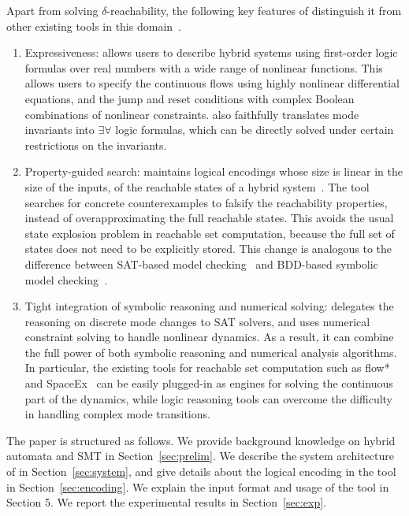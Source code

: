 Apart from solving $\delta$-reachability, the following key features
of \dReach{} distinguish it from other existing tools in this
domain~\cite{DBLP:journals/jlp/FranzleTE10,DBLP:conf/cav/FrehseGDCRLRGDM11,DBLP:journals/tac/AlthoffK14,DBLP:conf/hybrid/Frehse05,DBLP:conf/icons/HerdeEFT08,DBLP:conf/rtss/ChenAS12,DBLP:conf/aaai/CimattiMT12}.
\begin{enumerate}
\item Expressiveness: \dReach{} allows users to describe hybrid
  systems using first-order logic formulas over real numbers with a
  wide range of nonlinear functions. This allows users to specify the
  continuous flows using highly nonlinear differential equations, and
  the jump and reset conditions with complex Boolean combinations of
  nonlinear constraints. \dReach{} also faithfully translates mode
  invariants into $\exists\forall$ logic formulas, which can be
  directly solved under certain restrictions on the invariants.
\item Property-guided search: \dReach{} maintains logical encodings
  whose size is linear in the size of the inputs, of the reachable
  states of a hybrid system~\cite{DBLP:journals/corr/GaoKCC14}. The
  tool searches for concrete counterexamples to falsify the
  reachability properties, instead of overapproximating the full
  reachable states. This avoids the usual state explosion problem in
  reachable set computation, because the full set of states does not
  need to be explicitly stored. This change is analogous to the
  difference between SAT-based model
  checking~\cite{Biere:1999:SMC:646483.691738} and BDD-based symbolic
  model checking~\cite{McMillan:1993:SMC:530225}.
\item Tight integration of symbolic reasoning and numerical solving:
  \dReach{} delegates the reasoning on discrete mode changes to SAT
  solvers, and uses numerical constraint solving to handle nonlinear
  dynamics. As a result, it can combine the full power of both
  symbolic reasoning and numerical analysis algorithms. In particular,
  the existing tools for reachable set computation such as
  flow*~\cite{DBLP:conf/cav/ChenAS13} and
  SpaceEx~\cite{DBLP:conf/cav/FrehseGDCRLRGDM11} can be easily
  plugged-in as engines for solving the continuous part of the
  dynamics, while logic reasoning tools can overcome the difficulty in
  handling complex mode transitions.
\end{enumerate}

The paper is structured as follows. We provide background knowledge on
hybrid automata and SMT in Section~\ref{sec:prelim}. We describe the
system architecture of \dReach{} in Section~\ref{sec:system}, and give
details about the logical encoding in the tool in
Section~\ref{sec:encoding}. We explain the input format and
usage of the tool in Section 5. We report the experimental results in Section~\ref{sec:exp}.
%


